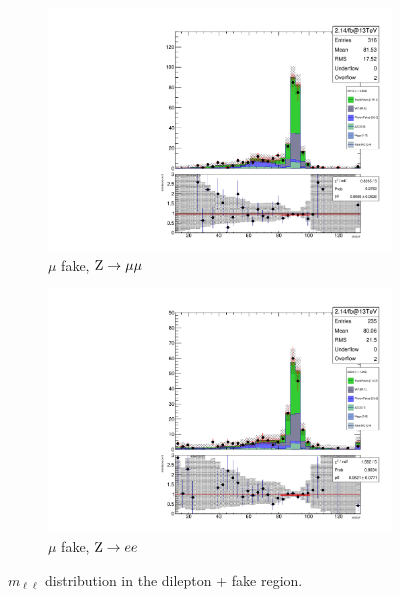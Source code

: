 \begin{figure}
\begin{center}
\begin{subfigure}[b]{.5\textwidth}
		\includegraphics[width=\textwidth]{Background/bkg_fakeLight/Z_3mu_MOSSF}
		\caption{$\mu$ fake, $\mathrm{Z} \to \mu\mu$}
	\end{subfigure}%
	\begin{subfigure}[b]{.5\textwidth}
		\includegraphics[width=\textwidth]{Background/bkg_fakeLight/Z_2el1mu_MOSSF}
		\caption{$\mu$ fake, $\mathrm{Z} \to e e$}
	\end{subfigure}%
	\caption{$m_{\ell\ell}$ distribution in the dilepton + fake region.
	\label{fig:fakeLight_Z_MOSSF_byFlavor}}
\end{center}
\end{figure}

